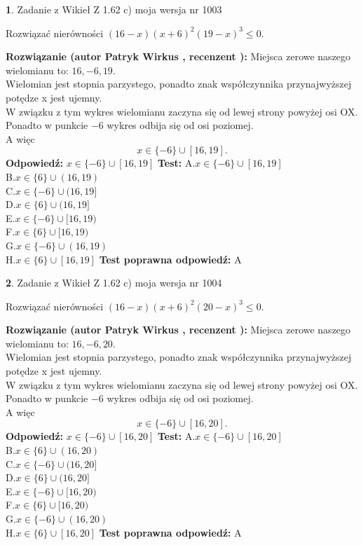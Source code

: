 \documentclass[12pt, a4paper]{article}
\theoremstyle{definition} %
\newtheorem{zad}{}
\newcommand{\zadStart}[1]{\begin{zad}#1\newline}
\newcommand{\zadStop}{\end{zad}}
\newcommand{\rozwStart}[2]{\noindent \textbf{Rozwiązanie (autor #1 , recenzent #2): }\newline}
\newcommand{\rozwStop}{\newline}
\newcommand{\odpStart}{\noindent \textbf{Odpowiedź:}\newline}
\newcommand{\odpStop}{\newline}
\newcommand{\testStart}{\noindent \textbf{Test:}\newline}
\newcommand{\testStop}{\newline}
\newcommand{\kluczStart}{\noindent \textbf{Test poprawna odpowiedź:}\newline}
\newcommand{\kluczStop}{\newline}
\begin{document}
\zadStart{Zadanie z Wikieł Z 1.62 c) moja wersja nr 1003}

Rozwiązać nierówności $(16-x)(x+6)^{2}(19-x)^{3}\le0$.
\zadStop
\rozwStart{Patryk Wirkus}{}
Miejsca zerowe naszego wielomianu to: $16, -6, 19$.\\
Wielomian jest stopnia parzystego, ponadto znak współczynnika przy\linebreak najwyższej potędze x jest ujemny.\\ W związku z tym wykres wielomianu zaczyna się od lewej strony powyżej osi OX.\\
Ponadto w punkcie $-6$ wykres odbija się od osi poziomej.\\
A więc $$x \in \{-6\} \cup [16,19].$$
\rozwStop
\odpStart
$x \in \{-6\} \cup [16,19]$
\odpStop
\testStart
A.$x \in \{-6\} \cup [16,19]$\\
B.$x \in \{6\} \cup (16,19)$\\
C.$x \in \{-6\} \cup (16,19]$\\
D.$x \in \{6\} \cup (16,19]$\\
E.$x \in \{-6\} \cup [16,19)$\\
F.$x \in \{6\} \cup [16,19)$\\
G.$x \in \{-6\} \cup (16,19)$\\
H.$x \in \{6\} \cup [16,19]$
\testStop
\kluczStart
A
\kluczStop



\zadStart{Zadanie z Wikieł Z 1.62 c) moja wersja nr 1004}

Rozwiązać nierówności $(16-x)(x+6)^{2}(20-x)^{3}\le0$.
\zadStop
\rozwStart{Patryk Wirkus}{}
Miejsca zerowe naszego wielomianu to: $16, -6, 20$.\\
Wielomian jest stopnia parzystego, ponadto znak współczynnika przy\linebreak najwyższej potędze x jest ujemny.\\ W związku z tym wykres wielomianu zaczyna się od lewej strony powyżej osi OX.\\
Ponadto w punkcie $-6$ wykres odbija się od osi poziomej.\\
A więc $$x \in \{-6\} \cup [16,20].$$
\rozwStop
\odpStart
$x \in \{-6\} \cup [16,20]$
\odpStop
\testStart
A.$x \in \{-6\} \cup [16,20]$\\
B.$x \in \{6\} \cup (16,20)$\\
C.$x \in \{-6\} \cup (16,20]$\\
D.$x \in \{6\} \cup (16,20]$\\
E.$x \in \{-6\} \cup [16,20)$\\
F.$x \in \{6\} \cup [16,20)$\\
G.$x \in \{-6\} \cup (16,20)$\\
H.$x \in \{6\} \cup [16,20]$
\testStop
\kluczStart
A
\kluczStop
\end{document}
